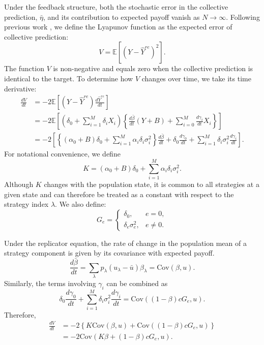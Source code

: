 \documentclass[12pt]{article}
\begin{document}
Under the feedback structure, both the stochastic error in the collective prediction, $\bar{\eta}$, and its contribution to expected payoff vanish as $N\to\infty$. 
Following previous work \citep{wang2025individual}, we define the Lyapunov function as the expected error of collective prediction: 
\begin{equation}
V = \mathbb{E}\left[(Y-\hat{Y}^{re})^2\right].
\end{equation}
The function $V$ is non-negative and equals zero when the collective prediction is identical to the target. 
To determine how $V$ changes over time, we take its time derivative:
\begin{align}
\frac{dV}{dt}
&= -2\mathbb{E}\left[(Y-\hat{Y}^{re})\frac{d\hat{Y}^{re}}{dt}\right] \\
&= -2\mathbb{E}\left[(\delta_0+\sum_{i=1}^{M}\delta_iX_i)
\left\{\frac{d\bar{\beta}}{dt}(Y+B)+\sum_{i=0}^{M}\frac{d\gamma_i}{dt}X_i\right\}\right] \\
&= -2\left[\left\{(\alpha_0+B)\delta_0+\sum_{i=1}^{M}\alpha_i\delta_i\sigma_i^2\right\}\frac{d\bar{\beta}}{dt}
+\delta_0\frac{d\gamma_0}{dt}
+\sum_{i=1}^{M}\delta_i\sigma_i^2\frac{d\gamma_i}{dt}\right].
\end{align}
For notational convenience, we define
\begin{equation}
K = (\alpha_0+B)\delta_0+\sum_{i=1}^{M}\alpha_i\delta_i\sigma_i^2.
\end{equation}
Although $K$ changes with the population state, it is common to all strategies at a given state and can therefore be treated as a constant with respect to the strategy index $\lambda$.
We also define:
\begin{equation}
G_e =
\begin{cases}
\delta_0, & e=0,\\
\delta_e\sigma_e^2, & e\neq0.
\end{cases}
\end{equation}

Under the replicator equation, the rate of change in the population mean of a strategy component is given by its covariance with expected payoff. 
\begin{equation}
\frac{d\bar{\beta}}{dt} = \sum_\lambda p_\lambda(u_\lambda-\bar{u})\beta_\lambda = \mathrm{Cov}(\beta,u).
\end{equation}
Similarly, the terms involving $\gamma_i$ can be combined as
\begin{equation}
\delta_0\frac{d\gamma_0}{dt} + \sum_{i=1}^{M}\delta_i\sigma_i^2\frac{d\gamma_i}{dt}
= \mathrm{Cov}((1-\beta)cG_e,u).
\end{equation}
Therefore,
\begin{align}
\frac{dV}{dt}
&= -2\left\{K\mathrm{Cov}(\beta,u)+\mathrm{Cov}((1-\beta)cG_e,u)\right\} \\
&= -2\mathrm{Cov}(K\beta+(1-\beta)cG_e,u).
\end{align}
\end{document}
